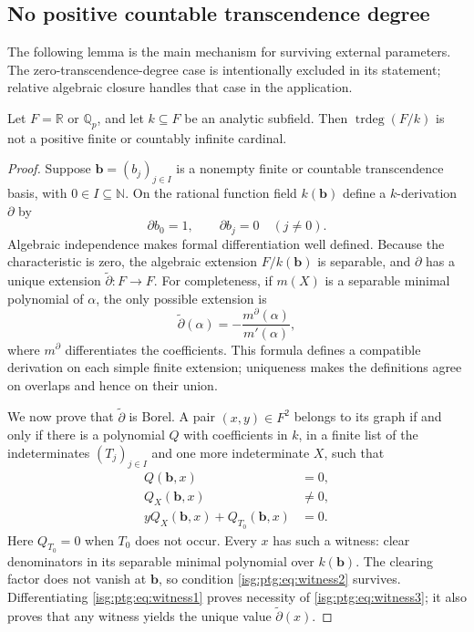 \documentclass[11pt]{article}
\theoremstyle{definition}
\theoremstyle{remark}
\newcommand{\R}{\mathbb{R}}
\newcommand{\N}{\mathbb{N}}
\newcommand{\Qp}{\mathbb{Q}_p}
\newcommand{\trdeg}{\operatorname{trdeg}}
\begin{document}
\subsection{No positive countable transcendence degree}\label{isg:ptg:sec:derivation}
The following lemma is the main mechanism for surviving external
parameters. The zero-transcendence-degree case is intentionally excluded
in its statement; relative algebraic closure handles that case in the
application.

\begin{lemma}\label{isg:ptg:lem:derivation}
Let $F=\R$ or $\Qp$, and let $k\subseteq F$ be an analytic subfield. Then
$\trdeg(F/k)$ is not a positive finite or countably infinite cardinal.
\end{lemma}
\begin{proof}
Suppose $\mathbf b=(b_j)_{j\in I}$ is a nonempty finite or countable
transcendence basis, with $0\in I\subseteq\N$. On the rational function
field $k(\mathbf b)$ define a $k$-derivation $\partial$ by
\[
 \partial b_0=1,\qquad \partial b_j=0\quad(j\ne0).
\]
Algebraic independence makes formal differentiation well defined. Because
the characteristic is zero, the algebraic extension $F/k(\mathbf b)$ is
separable, and $\partial$ has a unique extension $\widetilde\partial:F\to F$.
For completeness, if $m(X)$ is a separable minimal polynomial of $\alpha$,
the only possible extension is
\[
 \widetilde\partial(\alpha)=-\frac{m^{\partial}(\alpha)}{m'(\alpha)},
\]
where $m^{\partial}$ differentiates the coefficients. This formula defines a
compatible derivation on each simple finite extension; uniqueness makes
the definitions agree on overlaps and hence on their union.

We now prove that $\widetilde\partial$ is Borel. A pair $(x,y)\in F^2$
belongs to its graph if and only if there is a polynomial $Q$ with
coefficients in $k$, in a finite list of the indeterminates
$(T_j)_{j\in I}$ and one more indeterminate $X$, such that
\begin{align}
 Q(\mathbf b,x)&=0,\label{isg:ptg:eq:witness1}\\
 Q_X(\mathbf b,x)&\ne0,\label{isg:ptg:eq:witness2}\\
 yQ_X(\mathbf b,x)+Q_{T_0}(\mathbf b,x)&=0.\label{isg:ptg:eq:witness3}
\end{align}
Here $Q_{T_0}=0$ when $T_0$ does not occur. Every $x$ has such a witness:
clear denominators in its separable minimal polynomial over $k(\mathbf b)$.
The clearing factor does not vanish at $\mathbf b$, so condition
\eqref{isg:ptg:eq:witness2} survives. Differentiating
\eqref{isg:ptg:eq:witness1} proves necessity of
\eqref{isg:ptg:eq:witness3}; it also proves that any witness yields the
unique value $\widetilde\partial(x)$.


\end{proof}
\end{document}
